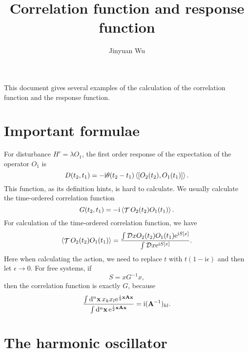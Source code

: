 \documentclass[hyperref, a4paper]{article}
\title{Correlation function and response function}
\author{Jinyuan Wu}
\DeclareMathOperator{\timeorder}{\mathcal{T}}
\newcommand*{\ii}{\mathrm{i}}
\newcommand*{\ee}{\mathrm{e}}
\newcommand*{\fd}[1]{\mathcal{D} #1}
\begin{document}
\maketitle

This document gives several examples of the calculation of 
the correlation function and the response function.

\section{Important formulae}

For disturbance $H' = \lambda O_1$, 
the first order response of the expectation of the operator $O_1$ is 
\begin{equation}
    D(t_2, t_1) = - \ii \theta(t_2 - t_1) \expval{\comm{O_2(t_2)}{O_1(t_1)}}.
\end{equation}
This function, as its definition hints, 
is hard to calculate. 
We usually calculate the time-ordered correlation function
\begin{equation}
    G(t_2, t_1) = - \ii \expval{\timeorder O_2(t_2) O_1(t_1)}.
\end{equation}
For calculation of the time-ordered correlation function, we have 
\begin{equation}
    \expval{\timeorder O_2(t_2) O_1(t_1)} = 
    \frac{
        \int \fd{x} O_2(t_2) O_1(t_1) \ee^{\ii S[x]}
    }{
        \int \fd{x} \ee^{\ii S[x]}
    }.
\end{equation}
Here when calculating the action,
we need to replace $t$ with $t (1 - \ii \epsilon)$ and then let $\epsilon \to 0$.
For free systems, if 
\begin{equation}
    S = x G^{-1} x,
\end{equation}
then the correlation function is exactly $G$, because 
\begin{equation}
    \frac{
        \int \dd[n]{\vb{x}} x_k x_l \ee^{\frac{\ii}{2} \vb{x} \vb{A} \vb{x}}
    }{
        \int \dd[n]{\vb{x}} \ee^{\frac{\ii}{2} \vb{x} \vb{A} \vb{x}}
    } = \ii (\vb{A}^{-1})_{kl}.
\end{equation}

\section{The harmonic oscillator}
\end{document}
